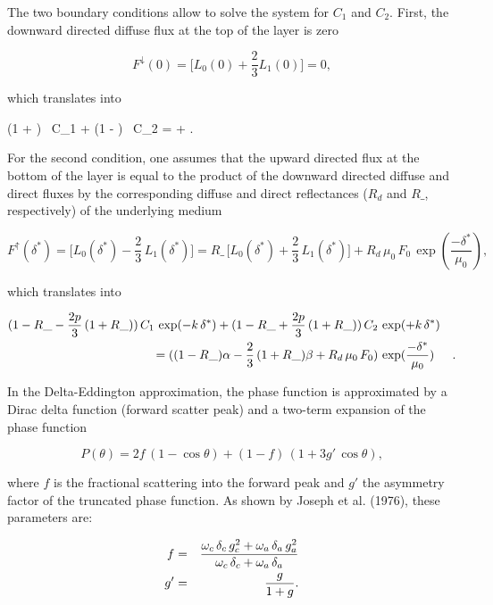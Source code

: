 The two boundary conditions allow to solve the system for $C_1$ and $C_2$.
First, the downward directed diffuse flux at the top of the layer is zero

\medskip
\[
F^{\!\downarrow}(0) = \bigl[ L_0(0) + \frac{2}{3} L_1(0) \bigr] = 0,
\]

\noindent which translates into

\be
(1 + ) \, C_1 + (1 - ) \, C_2 = \alpha + .
\label{ecmwf323}
\ee
\medskip

\noindent For the second condition, one assumes that the upward directed flux
at the bottom of the layer is equal to the product of the downward directed
diffuse and direct fluxes by the corresponding diffuse and direct reflectances
($R_d$ and $R\_$, respectively) of the underlying medium

\medskip
\[
F^{\!\uparrow}(\delta^{*}) = \bigl[ L_0(\delta^{*}) - \frac{2}{3} \, L_1(\delta^{*}) \bigr] = R\_ \, \bigl[ L_0(\delta^{*}) + \frac{2}{3} \, L_1(\delta^{*}) \bigr] + R_d \, \mu_0 \, F_0 \, \exp(\frac{-\delta^{*}}{\mu_0}),
\]
\medskip

\noindent which translates into

\medskip
\begin{eqnarray}\label{ecmwf324}
(1 - R\_ - \frac{2p}{3} \, (1 + R\_) ) \, C_1 \, \exp(-k \, \delta^{*}) +
(1 - R\_ + \frac{2p}{3} \, (1 + R\_) ) \, C_2 \, &\exp(+k \, \delta^{*})& \cr
\mbox{} = ( (1 - R\_)\alpha - \frac{2}{3} \, (1 + R\_)\beta +
R_d \, \mu_0 \, F_0 ) \, &\exp(\frac{-\delta^{*}}{\mu_0})&.
\end{eqnarray}
\medskip

In the Delta-Eddington approximation, the phase function is approximated by a
Dirac delta function (forward scatter peak) and a two-term expansion of the
phase function

\medskip
\[
P(\theta) = 2 f \, (1 - \cos\theta) + (1 - f) \, (1 + 3g' \, \cos\theta),
\]

\noindent where $f$ is the fractional scattering into the forward peak and $g'$ the asymmetry factor of the truncated phase function. As shown by Joseph et al. (1976), these parameters are:

\medskip
\begin{eqnarray}\label{ecmwf325}
f  &=&  \frac{\omega_c \, \delta_c \, g_c^2+ \omega_a \, \delta_a \, g_a^2}
{\omega_c \, \delta_c + \omega_a \, \delta_a} \cr
g' &=& \frac{g}{1+g}.
\end{eqnarray}

